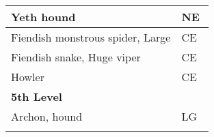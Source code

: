 \begin{longtable}{llll}
\hline
\multicolumn{1}{|p{3.326in}|}{\begin{minipage}[t]{3.326in}\raggedright
Yeth hound\end{minipage}} & \multicolumn{3}{p{0.601in}|}{\begin{minipage}[t]{0.601in}\raggedright
NE\end{minipage}}\\
\hline
\multicolumn{1}{|p{3.326in}|}{\begin{minipage}[t]{3.326in}\raggedright
Fiendish monstrous spider, Large\end{minipage}} & \multicolumn{3}{p{0.601in}|}{\begin{minipage}[t]{0.601in}\raggedright
CE\end{minipage}}\\
\hline
\multicolumn{1}{|p{3.326in}|}{\begin{minipage}[t]{3.326in}\raggedright
Fiendish snake, Huge viper\end{minipage}} & \multicolumn{3}{p{0.601in}|}{\begin{minipage}[t]{0.601in}\raggedright
CE\end{minipage}}\\
\hline
\multicolumn{1}{|p{3.326in}|}{\begin{minipage}[t]{3.326in}\raggedright
Howler\end{minipage}} & \multicolumn{3}{p{0.601in}|}{\begin{minipage}[t]{0.601in}\raggedright
CE\end{minipage}}\\
\hline
\multicolumn{1}{|p{3.326in}|}{\begin{minipage}[t]{3.326in}\raggedright
\textbf{5th Level}\end{minipage}} & \multicolumn{3}{p{0.601in}|}{\begin{minipage}[t]{0.601in}\raggedright
\end{minipage}}\\
\hline
\multicolumn{1}{|p{3.326in}|}{\begin{minipage}[t]{3.326in}\raggedright
Archon, hound\end{minipage}} & \multicolumn{3}{p{0.601in}|}{\begin{minipage}[t]{0.601in}\raggedright
LG\end{minipage}}\\
\hline
\multicolumn{1}{|p{3.326in}|}{\begin{minipage}[t]{3.326in}\raggedright

\end{minipage}}
\end{longtable}
